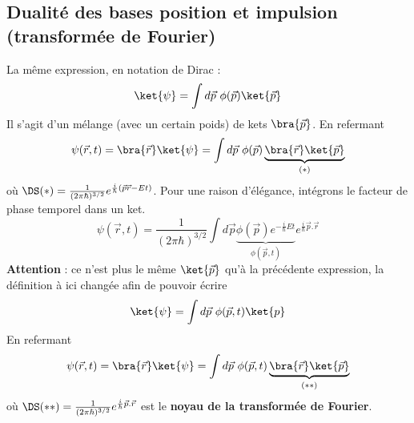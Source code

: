 	\subsection{Dualité des bases position et impulsion (transformée de Fourier)}
	La même expression, en notation de Dirac :
	\begin{equation}
	\ket{\psi} = \int d\vec{p}\ \phi(\vec{p})\ket{\vec{p}}
	\end{equation}
	Il s'agit d'un mélange (avec un certain poids) de kets $\bra{\vec{p}}$. En refermant
		\begin{equation}
	\psi(\vec{r},t) = \bra{\vec{r}}\ket{\psi} = \int d\vec{p}\ \phi(\vec{p})\underbrace{
	\bra{\vec{r}}\ket{\vec{p}}}_{(*)}
	\end{equation}
	où $\DS (*) = \frac{1}{(2\pi\hbar)^{3/2}}e^{\frac{i}{\hbar}(\vec{p}\vec{r}-Et)}$.
	Pour une raison d'élégance, intégrons le facteur de phase temporel dans un ket.	
	\begin{equation}
		\psi(\vec{r},t) = \frac{1}{(2\pi\hbar)^{3/2}}\int d\vec{p} \underbrace{\phi(\vec{p})e^{-\frac{i}
	{\hbar}Et}}_{\phi(\vec{p},t)}e^{\frac{i}{\hbar}\vec{p}.\vec{r}}
	\end{equation}
	\textbf{Attention} : ce n'est plus le même $\ket{\vec{p}}$ qu'à la précédente expression, la 
	définition à ici changée afin de pouvoir écrire
	\begin{equation}
	\ket{\psi} = \int d\vec{p}\ \phi(\vec{p},t)\ket{p}
		\end{equation}
	En refermant
	\begin{equation}
	\psi(\vec{r},t) = \bra{\vec{r}}\ket{\psi} = \int d\vec{p}\ \phi(\vec{p},t)
	\underbrace{\bra{\vec{r}}\ket{\vec{p}}}_{(**)}
		\end{equation}
	où $\DS (**)= \frac{1}{(2\pi\hbar)^{3/2}}e^{\frac{i}{\hbar}\vec{p}.\vec{r}}$ est le 
	\textbf{noyau de la transformée de Fourier}.\\
	
